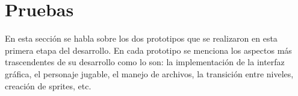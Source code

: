 \section{Pruebas}
En esta sección se habla sobre los dos prototipos que se realizaron en esta 
primera etapa del desarrollo. En cada prototipo se menciona los aspectos más 
trascendentes de su desarrollo como lo son: la implementación de la interfaz 
gráfica, el personaje jugable, el manejo de archivos, la transición entre 
niveles, creación de sprites, etc.    


		
